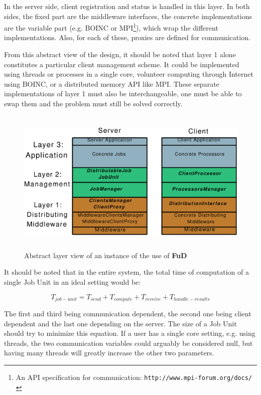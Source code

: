 \documentclass[a4paper,12pt,english]{report}
\newcommand{\fud}{\textbf{FuD}}
\begin{document}
In the server side, client registration and status is handled in this layer. In both sides, the fixed part are the middleware interfaces, the concrete implementations are the variable part (e.g. BOINC or MPI\footnote{An API specification for communication: \texttt{http://www.mpi-forum.org/docs/}}), which wrap the different implementations. Also, for each of these, proxies are defined for communication. 

From this abstract view of the design, it should be noted that layer 1 alone constitutes a particular client management scheme. It could be implemented using threads or processes in a single core, volunteer computing through Internet using BOINC, or a distributed memory API like MPI. These separate implementations of layer 1 must also be interchangeable, one must be able to swap them and the problem must still be solved correctly.

\begin{figure}[!ht]
\begin{center}
\includegraphics [height=7cm]{images/AbstractLayers.eps}
\end{center}
\caption{Abstract layer view of an instance of the use of \fud }
\label{abslayers}
\end{figure}

It should be noted that in the entire system, the total time of computation of a single Job Unit in an ideal setting would be:

$$T_{job-unit} = T_{send} + T_{compute} + T_{receive} + T_{handle-results}$$

The first and third being communication dependent,  the second one being client dependent and the last one depending on the server. The size of a Job Unit should try to minimize this equation. If a user has a single core setting, e.g. using threads, the two communication variables could arguably be considered null, but having many threads will greatly increase the other two parameters.
\end{document}

